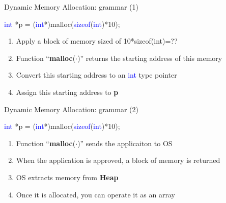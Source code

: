 \begin{frame}[fragile]{Dynamic Memory Allocation: grammar (1)}
\begin{center}
\Large{
  \textcolor{blue}{int} *p = (\textcolor{blue}{int}*)malloc(\textcolor{blue}{sizeof}(\textcolor{blue}{int})*10);
}
\end{center}
\vspace{0.2in}
\begin{enumerate}
	\item {Apply a block of memory sized of 10*sizeof(int)=??}
	\item {Function ``\textbf{malloc}($\cdot$)'' returns the starting address of this memory}
	\item {Convert this starting address to an \textcolor{blue}{int} type pointer}
	\item {Assign this starting address to \textbf{p}}
\end{enumerate}
\end{frame}

\begin{frame}[fragile]{Dynamic Memory Allocation: grammar (2)}
\begin{center}

\Large{
  \textcolor{blue}{int} *p = (\textcolor{blue}{int}*)malloc(\textcolor{blue}{sizeof}(\textcolor{blue}{int})*10);
}

\end{center}
\vspace{0.2in}
\begin{enumerate}
	\item {Function ``\textbf{malloc}($\cdot$)'' sends the applicaiton to OS}
	\item {When the application is approved, a block of memory is returned}
	\item {OS extracts memory from \textbf{Heap}}
	\item {Once it is allocated, you can operate it as an array}
\end{enumerate}
\end{frame}

